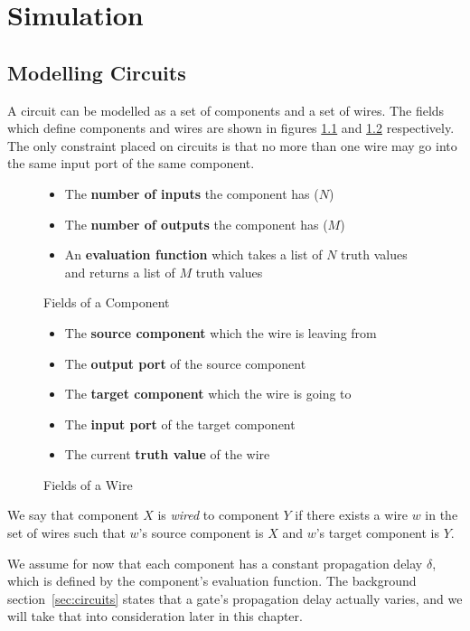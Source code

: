 \chapter{Simulation}
\label{chapter:simulation}

\section{Modelling Circuits}
A circuit can be modelled as a set of components and a set of wires. The fields which define components and wires are shown in figures \ref{fig:component} and \ref{fig:wire} respectively. The only constraint placed on circuits is that no more than one wire may go into the same input port of the same component.

\begin{figure}[H]
\centering
\begin{itemize}
	\item The \textbf{number of inputs} the component has ($N$)
	\item The \textbf{number of outputs} the component has ($M$)
	\item An \textbf{evaluation function} which takes a list of $N$ truth values and returns a list  of $M$ truth values
\end{itemize}
\caption{Fields of a Component}
\label{fig:component}
\end{figure}

\begin{figure}[H]
\centering
\begin{itemize}
	\item The \textbf{source component} which  the wire is leaving from
	\item The \textbf{output port} of the source component
	\item The \textbf{target component} which the wire is going to
	\item The \textbf{input port} of the target component
	\item The current \textbf{truth value} of the wire 
\end{itemize}
\caption{Fields of a Wire}
\label{fig:wire}
\end{figure}

We say that component $X$ is \textit{wired} to component $Y$ if there exists a wire $w$ in the set of wires such that $w$'s source component is $X$ and $w$'s target component is $Y$.

We assume for now that each component has a constant propagation delay $\delta$, which is defined by the component's evaluation function. The background section~\ref{sec:circuits} states that a gate's propagation delay actually varies, and we will take that into consideration later in this chapter.

